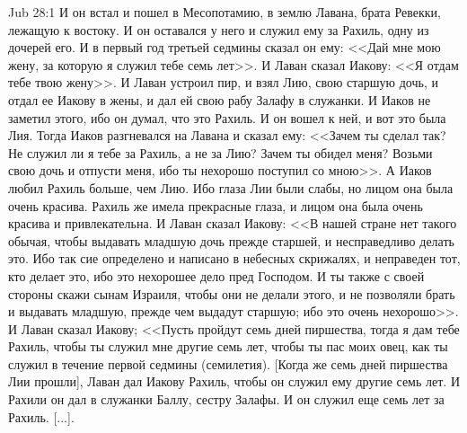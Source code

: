 \vs Jub 28:1
И он встал и пошел в Месопотамию, в землю Лавана,
брата Ревекки, лежащую к востоку. И он оставался у
него и служил ему за Рахиль, одну из дочерей его. И
в первый год третьей седмины сказал он ему:
<<Дай мне мою жену, за которую я служил тебе семь
лет>>. И Лаван сказал Иакову: <<Я отдам тебе
твою жену>>. И Лаван устроил пир, и взял Лию, свою
старшую дочь, и отдал ее Иакову в жены, и дал ей
свою рабу Залафу в служанки. И Иаков не заметил
этого, ибо он думал, что это Рахиль. И он вошел к
ней, и вот это была Лия. Тогда Иаков разгневался
на Лавана и сказал ему: <<Зачем ты сделал так? Не
служил ли я тебе за Рахиль, а не за Лию? Зачем ты
обидел меня? Возьми свою дочь и отпусти меня, ибо
ты нехорошо поступил со мною>>. А Иаков любил
Рахиль больше, чем Лию. Ибо глаза Лии были слабы,
но лицом она была очень красива. Рахиль же имела
прекрасные глаза, и лицом она была очень красива
и привлекательна. И Лаван сказал Иакову: <<В
нашей стране нет такого обычая, чтобы выдавать
младшую дочь прежде старшей, и несправедливо
делать это. Ибо так сие определено и написано в
небесных скрижалях, и неправеден тот, кто делает
это, ибо это нехорошее дело пред Господом. И ты
также с своей стороны скажи сынам Израиля, чтобы
они не делали этого, и не позволяли брать и
выдавать младшую, прежде чем выдадут старшую; ибо
это очень нехорошо>>. И Лаван сказал Иакову;
<<Пусть пройдут семь дней пиршества, тогда я дам
тебе Рахиль, чтобы ты служил мне другие семь лет,
чтобы ты пас моих овец, как ты служил в течение
первой седмины (семилетия). [Когда же семь дней
пиршества Лии прошли], Лаван дал Иакову Рахиль,
чтобы он служил ему другие семь лет. И Рахили он
дал в служанки Баллу, сестру Залафы. И он служил
еще семь лет за Рахиль. [...].

